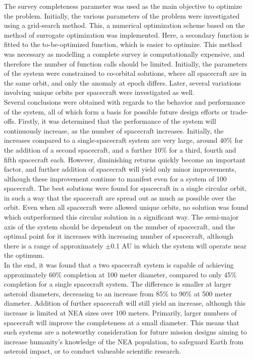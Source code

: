 The survey completeness parameter was used as the main objective to optimize the problem. Initially, the various parameters of the problem were investigated using a grid-search method. This, a numerical optimization scheme based on the method of surrogate optimization was implemented. Here, a secondary function is fitted to the to-be-optimized function, which is easier to optimize. This method was necessary as modelling a complete survey is computationally expensive, and therefore the number of function calls should be limited. Initially, the parameters of the system were constrained to co-orbital solutions, where all spacecraft are in the same orbit, and only the anomaly at epoch differs. Later, several variations involving unique orbits per spacecraft were investigated as well. \\

Several conclusions were obtained with regards to the behavior and performance of the system, all of which form a basis for possible future design efforts or trade-offs. Firstly, it was determined that the performance of the system will continuously increase, as the number of spacecraft increases. Initially, the increases compared to a single-spacecraft system are very large, around 40\% for the addition of a second spacecraft, and a further 10\% for a third, fourth and fifth spacecraft each. However, diminishing returns quickly become an important factor, and further addition of spacecraft will yield only minor improvements, although these improvement continue to manifest even for a system of 100 spacecraft. The best solutions were found for spacecraft in a single circular orbit, in such a way that the spacecraft are spread out as much as possible over the orbit. Even when all spacecraft were allowed unique orbits, no solution was found which outperformed this circular solution in a significant way. The semi-major axis of the system should be dependent on the number of spacecraft, and the optimal point for it increases with increasing number of spacecraft, although there is a range of approximately $\pm$0.1 AU in which the system will operate near the optimum. \\

In the end, it was found that a two spacecraft system is capable of achieving approximately 60\% completion at 100 meter diameter, compared to only 45\% completion for a single spacecraft system. The difference is smaller at larger asteroid diameters, decreasing to an increase from 85\% to 90\% at 500 meter diameter. Addition of further spacecraft will still yield an increase, although this increase is limited at NEA sizes over 100 meters. Primarily, larger numbers of spacecraft will improve the completeness at a small diameter. This means that such systems are a noteworthy consideration for future mission designs aiming to increase humanity's knowledge of the NEA population, to safeguard Earth from asteroid impact, or to conduct valueable scientific research.
